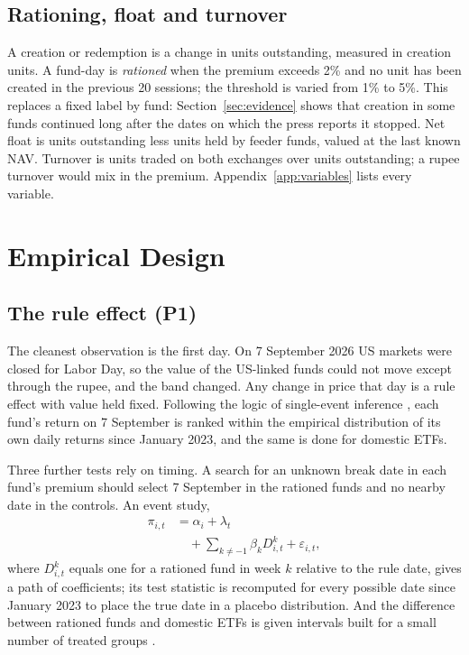 \subsection{Rationing, float and turnover}
A creation or redemption is a change in units outstanding, measured in creation units. A fund-day is \emph{rationed} when the premium exceeds 2\% and no unit has been created in the previous 20 sessions; the threshold is varied from 1\% to 5\%. This replaces a fixed label by fund: Section~\ref{sec:evidence} shows that creation in some funds continued long after the dates on which the press reports it stopped. Net float is units outstanding less units held by feeder funds, valued at the last known NAV. Turnover is units traded on both exchanges over units outstanding; a rupee turnover would mix in the premium. Appendix~\ref{app:variables} lists every variable.

\section{Empirical Design}\label{sec:design}
\subsection{The rule effect (P1)}
The cleanest observation is the first day. On 7 September 2026 US markets were closed for Labor Day, so the value of the US-linked funds could not move except through the rupee, and the band changed. Any change in price that day is a rule effect with value held fixed. Following the logic of single-event inference \citep{gelbach2013valid}, each fund's return on 7 September is ranked within the empirical distribution of its own daily returns since January 2023, and the same is done for domestic ETFs.

Three further tests rely on timing. A search for an unknown break date in each fund's premium \citep{bai1998estimating} should select 7 September in the rationed funds and no nearby date in the controls. An event study,
\begin{equation}\label{eq:event}
\begin{split}\pi_{i,t}&=\alpha_i+\lambda_t\\&\quad+\sum_{k\neq -1}\beta_k D^{k}_{i,t}+\varepsilon_{i,t},\end{split}
\end{equation}
where $D^{k}_{i,t}$ equals one for a rationed fund in week $k$ relative to the rule date, gives a path of coefficients; its test statistic is recomputed for every possible date since January 2023 to place the true date in a placebo distribution. And the difference between rationed funds and domestic ETFs is given intervals built for a small number of treated groups \citep{conley2011inference,ferman2019inference}.

